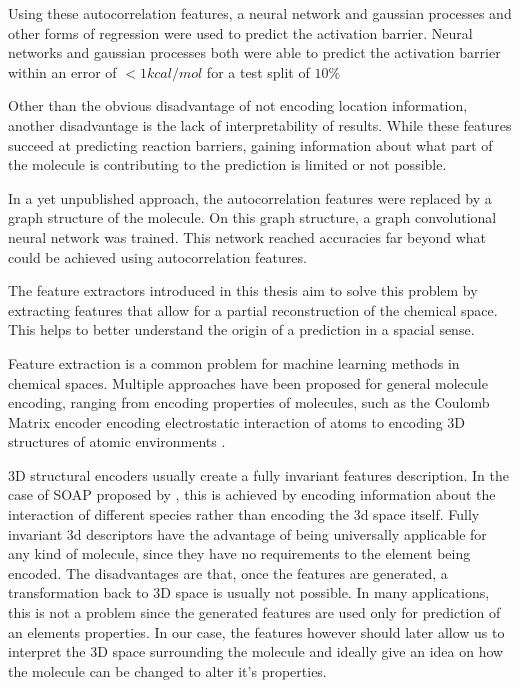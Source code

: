 Using these autocorrelation features, a neural network and gaussian processes and other forms of regression were used to predict the activation barrier.
Neural networks and gaussian processes both were able to predict the activation barrier within an error of $<1 kcal/mol$ for a test split of $10\%$ %

Other than the obvious disadvantage of not encoding location information, another disadvantage is the lack of interpretability of results.
While these features succeed at predicting reaction barriers, gaining 
information about what part of the molecule is contributing to the prediction is limited or not possible.

In a yet unpublished approach, the autocorrelation features were replaced by a graph structure of the molecule.
On this graph structure, a graph convolutional neural network was trained.
This network reached accuracies far beyond what could be achieved using autocorrelation features.

The feature extractors introduced in this thesis aim to solve this problem by extracting features that allow for a
partial reconstruction of the chemical space.
This helps to better understand the origin of a prediction in a spacial sense.

Feature extraction is a common problem for machine learning methods in chemical spaces.
Multiple approaches have been proposed for general molecule encoding, 
ranging from encoding properties of molecules, such as the Coulomb Matrix encoder encoding electrostatic interaction of atoms \cite{PhysRevLett.108.058301}
to encoding 3D structures of atomic environments \cite{Bart_k_2013}.

3D structural encoders usually create a fully invariant features description.
In the case of SOAP proposed by \citeauthor{Bart_k_2013}, this is achieved by encoding information about the interaction of 
different species rather than encoding the 3d space itself.
Fully invariant 3d descriptors have the advantage of being universally applicable for any kind of molecule, since they have no requirements to the element being encoded.
The disadvantages are that, once the features are generated, a transformation back to 3D space is usually not possible.
In many applications, this is not a problem since the generated features are used only for prediction of an elements properties.
In our case, the features however should later allow us to interpret the 3D space surrounding the molecule and ideally give an idea on how the molecule can be changed to alter it's properties.

